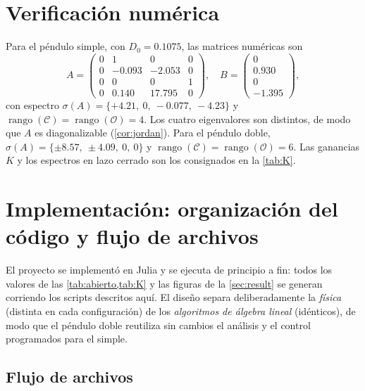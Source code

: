 \documentclass[11pt,letterpaper]{article}
\theoremstyle{definition}
\theoremstyle{plain}
\theoremstyle{remark}
\DeclareMathOperator{\rank}{rango}
\newcommand{\calC}{\mathcal{C}}
\newcommand{\calO}{\mathcal{O}}
\begin{document}
\section{Verificación numérica}
\label{anx:num}

Para el péndulo simple, con $D_0=0.1075$, las matrices numéricas son
\begin{equation*}
A=\begin{pmatrix}
0&1&0&0\\0&-0.093&-2.053&0\\0&0&0&1\\0&0.140&17.795&0
\end{pmatrix},\quad
B=\begin{pmatrix}0\\0.930\\0\\-1.395\end{pmatrix},
\end{equation*}
con espectro $\sigma(A)=\{+4.21,\ 0,\ -0.077,\ -4.23\}$ y
$\rank(\calC)=\rank(\calO)=4$. Los cuatro eigenvalores son distintos, de
modo que $A$ es diagonalizable (\cref{cor:jordan}). Para el péndulo doble,
$\sigma(A)=\{\pm8.57,\ \pm4.09,\ 0,\ 0\}$ y
$\rank(\calC)=\rank(\calO)=6$. Las ganancias $K$ y los espectros en lazo
cerrado son los consignados en la \cref{tab:K}.

\section{Implementación: organización del código y flujo de archivos}
\label{anx:impl}

El proyecto se implementó en Julia y se ejecuta de principio a fin: todos los
valores de las \cref{tab:abierto,tab:K} y las figuras de la \cref{sec:result}
se generan corriendo los scripts descritos aquí. El diseño separa
deliberadamente la \emph{física} (distinta en cada configuración) de los
\emph{algoritmos de álgebra lineal} (idénticos), de modo que el péndulo doble
reutiliza sin cambios el análisis y el control programados para el simple.

\subsection*{Flujo de archivos}
\end{document}
